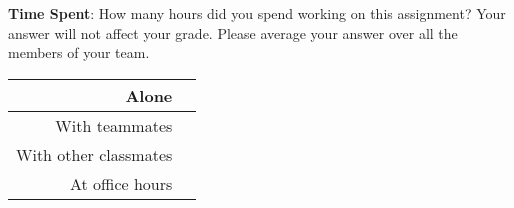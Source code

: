 \documentclass[12pt]{article}
\begin{document}
\noindent\textbf{Time Spent}: How many hours did you spend working on this assignment? Your answer will not affect your grade. Please average your answer over all the members of your team.
\begin{solution}[height=4cm]
\begin{table}[H]
    \centering
    \begin{tabular}{r|c}
        Alone &  \hspace{3em} %
        \\ \hline
        With teammates & \hspace{3em} %
        \\ \hline
        With other classmates & \hspace{3em} %
        \\ \hline
        At office hours & \hspace{3em} %
        \\ \hline
    \end{tabular}
\end{table}
\end{solution}
\end{document}
